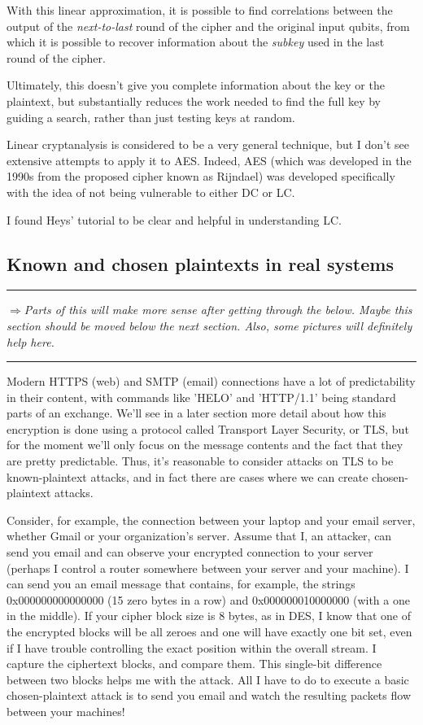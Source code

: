 \documentclass[%
 aip,
 jmp,%
 amsmath,amssymb,
 reprint,%
]{revtex4-1}
\def\outlinecomment#1{\hrule{\color{Blue}$\Rightarrow${\small\em #1}}\hrule}
\begin{document}
With this linear approximation, it is possible to find correlations
between the output of the \emph{next-to-last} round of the cipher and the
original input qubits, from which it is possible to recover
information about the \emph{subkey} used in the last round of the cipher.

Ultimately, this doesn't give you complete information about the key
or the plaintext, but substantially reduces the work needed to find
the full key by guiding a search, rather than just testing keys at
random.

Linear cryptanalysis is considered to be a very general technique, but
I don't see extensive attempts to apply it to AES.  Indeed, AES (which
was developed in the 1990s from the proposed cipher known as Rijndael)
was developed specifically with the idea of not being vulnerable to
either DC or LC.

I found Heys' tutorial to be clear and helpful in understanding LC.

\subsection{Known and chosen plaintexts in real systems}

\outlinecomment{Parts of this will make more sense after getting
  through the below.  Maybe this section should be moved below the
  next section.  Also, some pictures will definitely help here.}

Modern HTTPS (web) and SMTP (email) connections have a lot of
predictability in their content, with commands like 'HELO' and
'HTTP/1.1' being standard parts of an exchange.  We'll see in a later
section more detail about how this encryption is done using a protocol
called Transport Layer Security, or TLS, but for the moment we'll only
focus on the message contents and the fact that they are pretty
predictable.  Thus, it's reasonable to consider attacks on TLS to be
known-plaintext attacks, and in fact there are cases where we can
create chosen-plaintext attacks.

Consider, for example, the connection between your laptop and your
email server, whether Gmail or your organization's server.  Assume
that I, an attacker, can send you email and can observe your encrypted
connection to your server (perhaps I control a router somewhere
between your server and your machine).  I can send you an email
message that contains, for example, the strings 0x000000000000000 (15
zero bytes in a row) and 0x000000010000000 (with a one in the middle).
If your cipher block size is 8 bytes, as in DES, I know that one of
the encrypted blocks will be all zeroes and one will have exactly one
bit set, even if I have trouble controlling the exact position within
the overall stream.  I capture the ciphertext blocks, and compare
them.  This single-bit difference between two blocks helps me with the
attack.  All I have to do to execute a basic chosen-plaintext attack
is to send you email and watch the resulting packets flow between your
machines!
\end{document}
